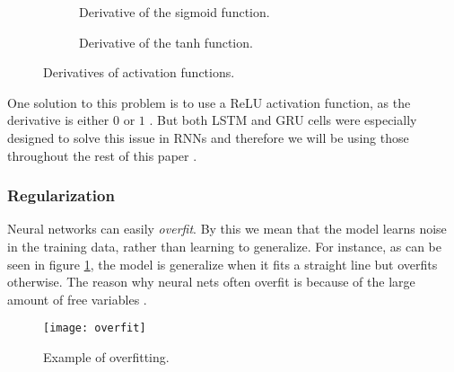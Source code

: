 \begin{figure}[ht]
  \centering
  \begin{subfigure}[b]{0.45\textwidth}
    \centering
    \caption{Derivative of the sigmoid function.}
  \end{subfigure}
  \begin{subfigure}[b]{0.45\textwidth}
    \centering
    \caption{Derivative of the tanh function.}
  \end{subfigure}
  \caption{Derivatives of activation functions.}
\end{figure}

One solution to this problem is to use a ReLU activation function, as the derivative is either $0$ or $1$ \cite{britz_2016}.
But both LSTM and GRU cells were especially designed to solve this issue in RNNs and therefore we will be using those throughout the rest of this paper \cite{LSTM,hochreiter1997long,cho2014learning}.

\subsubsection{Regularization}

Neural networks can easily \textit{overfit}.
By this we mean that the model learns noise in the training data, rather than learning to generalize.
For instance, as can be seen in figure \ref{fig:overfit}, the model is generalize when it fits a straight line but overfits otherwise.
The reason why neural nets often overfit is because of the large amount of free variables \cite{nielsen_2017}.

\begin{figure}[ht]
  \centering
  \texttt{[image: overfit]}
  \caption{Example of overfitting.}
  \label{fig:overfit}
\end{figure}

